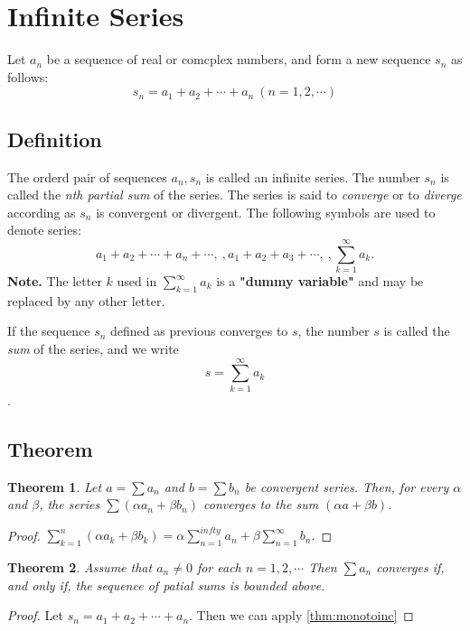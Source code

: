 \documentclass{article}
\newtheorem{theorem}{Theorem}[section]
\begin{document}
\section{Infinite Series}
Let ${a_{n}}$ be a sequence of real or comcplex
numbers, and form a new sequence ${s_{n}}$ as follows:
$$s_{n}=a_{1}+a_{2}+\cdots +a_{n}\ (n=1,2,\cdots)$$

\subsection{Definition}
The orderd pair of sequences ${a_{n}},{s_{n}}$ is 
called an infinite series. The number $s_{n}$ is called 
the \textit{nth partial sum} of the series. The series is said 
to \textit{converge} or to \textit{diverge} according 
as ${s_{n}}$ is convergent or divergent. The following 
symbols are used to denote series:
$$a_{1}+a_{2}+\cdots +a_{n}+\cdots,\ ,a_{1}+a_{2}+a_{3}+\cdots,\ ,\sum_{k=1}^{\infty}a_{k}.$$
\textbf{Note.} The letter $k$ used in $\sum_{k=1}^{\infty}a_{k}$ 
is a \textbf{"dummy variable"} and may be replaced by 
any other letter.

If the sequence ${s_{n}}$ defined as previous converges to $s$, the 
number $s$ is called the \textit{sum} of the series, and we write
$$ s=\sum_{k=1}^{\infty}a_{k}$$.

\subsection{Theorem}
\begin{theorem}
    Let $a=\sum a_{n}$ and $b=\sum b_{n}$ be convergent 
    series. Then, for every $\alpha$ and $\beta$, the series $\sum (\alpha a_{n}+\beta b_{n})$
    converges to the sum $(\alpha a+\beta b)$.
\end{theorem}
\begin{proof}
    $\sum_{k=1}^{n} (\alpha a_{k}+\beta b_{k})=\alpha \sum_{n=1}^{infty}a_{n}+\beta \sum_{n=1}^{\infty}b_{n}.$
\end{proof}

\begin{theorem}
    Assume that $a_{n}\neq 0$ for each $n=1,2,\cdots$ Then $\sum a_{n}$
    converges if, and only if, the sequence of patial sums is bounded above.
\end{theorem}
\begin{proof}
    Let $s_{n}=a_{1}+a_{2}+\cdots+a_{n}$. Then we can apply \ref{thm:monotoinc}
\end{proof}
\end{document}
